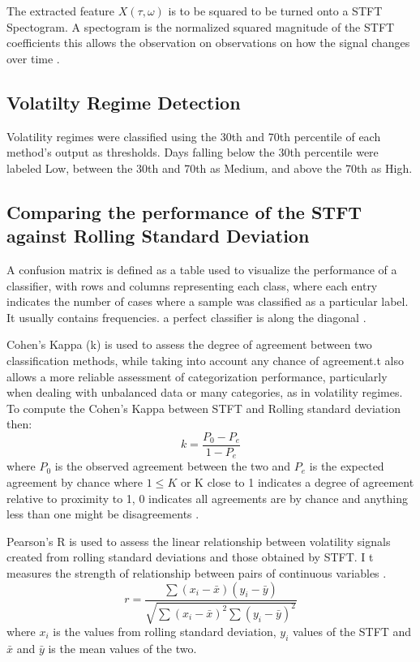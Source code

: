 \documentclass[12pt,letterpaper]{article}
\begin{document}
			The extracted feature $X(\tau, \omega)$ is to be squared to be turned onto a STFT Spectogram. A spectogram is the normalized squared magnitude of the STFT coefficients this allows the observation on observations on how the signal changes over time \parencite{stern_stft_notes}.
			
		\subsection{Volatilty Regime Detection}
			Volatility regimes were classified using the 30th and 70th percentile of each method's output as thresholds. Days falling below the 30th percentile were labeled Low, between the 30th and 70th as Medium, and above the 70th as High.
		
		\subsection{Comparing the performance of the STFT against Rolling Standard Deviation}
			A confusion matrix is defined as a table used to visualize the performance of a classifier, with rows and columns representing each class, where each entry indicates the number of cases where a sample was classified as a particular label. It usually contains frequencies. a perfect classifier is  along the diagonal \parencite{sd_confusion_matrix}.
			
			Cohen’s Kappa (k) is used to assess the degree of agreement between two classification methods, while taking into account any chance of agreement.t also allows a more reliable assessment of categorization performance, particularly when
			dealing with unbalanced data or many categories, as in volatility regimes.
			To compute the Cohen's Kappa between STFT and Rolling standard deviation then:
			\begin{equation}
				k = \frac{P_0 - P_e}{1 - P_e}
			\end{equation}
			where $P_0$ is the observed agreement between the two and $P_e$ is the expected agreement by chance
			where $1 \leq K$ or K close to 1 indicates a degree of agreement relative to proximity to 1, 0 indicates all agreements are by chance and anything less than one might be disagreements \parencite{numiqo_cohens_kappa}.
			
			Pearson's R is used to assess the linear relationship between volatility signals created from
			rolling standard deviations and those obtained by STFT. I t measures the strength of relationship between pairs of continuous variables \parencite{kent_pearson_correlation}.
			\begin{equation}
				r = \frac{\sum (x_i - \bar{x})(y_i - \bar{y})}{\sqrt{\sum (x_i - \bar{x})^2 \sum (y_i - \bar{y})^2}}
			\end{equation}
			where $x_i$ is the values from rolling standard deviation, $y_i$ values of the STFT and $\bar{x}$ and $\bar{y}$ is the mean values of the two.
			
\end{document}
